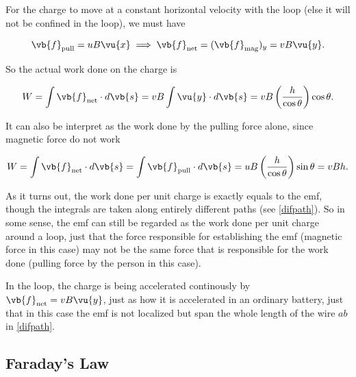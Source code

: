 \documentclass[english,a4paper,12pt]{report}
\begin{document}


For the charge to move at a constant horizontal velocity with the loop (else it will not be confined in the loop), we must have 

\begin{equation}
    \vb{f} _{\text{pull} } = uB \vu{x} \implies \vb{f} _{\text{net} } = (\vb{f} _{\text{mag} })_{y} = vB \vu{y} . 
\end{equation}

So the actual work done on the charge is 

\begin{equation}
    W = \int \vb{f} _{\text{net} } \cdot d \vb{s} = vB \int \vu{y} \cdot d \vb{s} = vB\left( \frac{h}{\cos \theta }  \right)\cos \theta .
\end{equation}

It can also be interpret as the work done by the pulling force alone, since magnetic force do not work

\begin{equation}
    W = \int \vb{f} _{\text{net} } \cdot d \vb{s} =  \int \vb{f} _{\text{pull} } \cdot  d \vb{s} =  uB \left( \frac{h}{\cos \theta }   \right) \sin \theta  = vBh.
\end{equation}

As it turns out, the work done per unit charge is exactly equals to the emf, though the integrals are taken along entirely different paths (see \cref{difpath}). So in some sense, the emf can still be regarded as the work done per unit charge around a loop, just that the force responsible for establishing the emf (magnetic force in this case) may not be the same force that is responsible for the work done (pulling force by the person in this case).

In the loop, the charge is being accelerated continously by \(\vb{f} _{\text{net} } = vB \vu{y}  \), just as how it is accelerated in an ordinary battery, just that in this case the emf is not localized but span the whole length of the wire \(ab\) in \cref{difpath}.    

\subsection{Faraday's Law}
\end{document}
